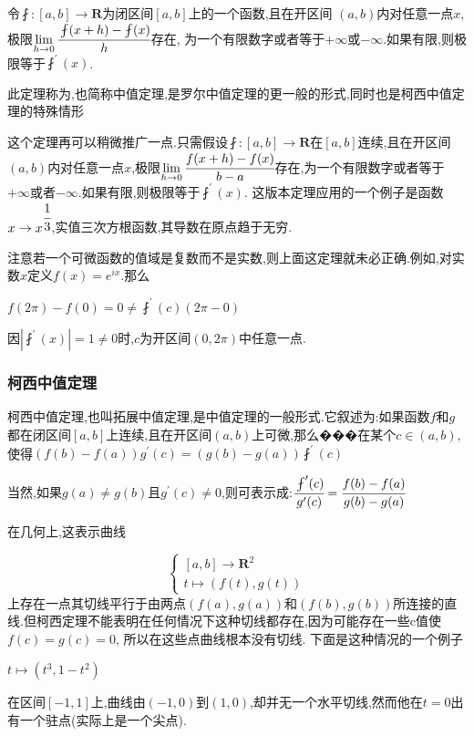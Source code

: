 \documentclass[UTF8,12pt]{ctexbook}
\newcommand{\limNormal}[1]{\lim\limits_{#1}}
\newcommand{\derivative}{^\prime}
\newcommand{\fDerivative}[1]{\fint\derivative(#1)}
\newcommand{\defFunction}[1]{f(#1)}
\begin{document}
{{{{令$\fint : [a,b] \to \mathbf{R}$为闭区间$[a,b]$上的一个函数,且在开区间
$(a,b)$内对任意一点$x$,极限$\limNormal{h \to 0}\cfrac{\fint(x + h) - \fint(x)}{h}$存在,
为一个有限数字或者等于$+\infty$或$-\infty$.如果有限,则极限等于$\fDerivative{x}$.

此定理称为{},也简称中值定理,是罗尔中值定理的更一般的形式,同时也是柯西中值定理的特殊情形

这个定理再可以稍微推广一点.只需假设$\fint : [a,b] \to \mathbf{R}$在$[a,b]$连续,且在开区间$(a,b)$内对任意一点$x$,极限$\limNormal{h \to 0}
  \cfrac{\defFunction{x + h} - \defFunction{x}}{b - a}$存在,为一个有限数字或者等于$+\infty$或者$-\infty$.如果有限,则极限等于$\fDerivative{x}$.
这版本定理应用的一个例子是函数$x \to x^{\cfrac{1}{3}}$,实值三次方根函数,其导数在原点趋于无穷.

注意若一个可微函数的值域是复数而不是实数,则上面这定理就未必正确.例如,对实数$x$定义$\defFunction{x} = e^{ix}$.那么

$\defFunction{2\pi} - \defFunction{0} = 0 \neq \fDerivative{c}(2\pi - 0)$

因$|\fDerivative{x}| = 1 \neq 0$时,$c$为开区间$(0,2\pi)$中任意一点.
}%

\subsubsection{柯西中值定理}{
  柯西中值定理,也叫拓展中值定理,是中值定理的一般形式.它叙述为:如果函数$f$和$g$都在闭区间$[a,b]$上连续,且在开区间$(a,b)$上可微,那么���在某个$c \in (a,b)$,
  使得$(\defFunction{b} - \defFunction{a})g\derivative(c) = (g(b)-g(a))\fDerivative{c}$

  当然,如果$g(a) \neq g(b)$且$g\derivative(c) \neq 0$,则可表示成:$\cfrac{\fDerivative{c}}{g\derivative(c)} = \cfrac{\defFunction{b} - \defFunction{a}}{g(b) - g(a)}$

  在几何上,这表示曲线

  $$
    \begin{cases}
      [a,b] \to \mathbf{R}^2 \\
      t \mapsto (f(t), g(t))
    \end{cases}
  $$
  上存在一点其切线平行于由两点$(\defFunction{a}, g(a))$和$(\defFunction{b}, g(b))$所连接的直线.但柯西定理不能表明在任何情况下这种切线都存在,因为可能存在一些c值使$\defFunction{c} = g(c) = 0$, 所以在这些点曲线根本没有切线.
  下面是这种情况的一个例子

  $t \mapsto (t^3, 1-t^2)$

  在区间$[-1,1]$上,曲线由$(-1, 0)$到$(1,0)$,却并无一个水平切线,然而他在$t = 0$出有一个驻点(实际上是一个尖点).

}}}}
\end{document}
